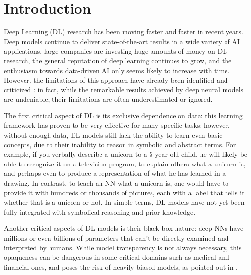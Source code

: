 \chapter{Introduction}
\label{introduction}

Deep Learning (DL) research has been moving faster and faster in recent years. Deep models continue to deliver state-of-the-art results in a wide variety of AI applications, large companies are investing huge amounts of money on DL research, the general reputation of deep learning continues to grow, and the enthusiasm towards data-driven AI only seems likely to increase with time. However, the limitations of this approach have already been identified and criticized \cite{marcus2018appraisal}: in fact, while the remarkable results achieved by deep neural models are undeniable, their limitations are often underestimated or ignored.

The first critical aspect of DL is its exclusive dependence on data: this learning framework has proven to be very effective for many specific tasks; however, without enough data, DL models still lack the ability to learn even basic concepts, due to their inability to reason in symbolic and abstract terms. For example, if you verbally describe a unicorn to a 5-year-old child, he will likely be able to recognize it on a television program, to explain others what a unicorn is, and perhaps even to produce a representation of what he has learned in a drawing. In contrast, to teach an NN what a unicorn is, one would have to provide it with hundreds or thousands of pictures, each with a label that tells it whether that is a unicorn or not. In simple terms, DL models have not yet been fully integrated with symbolical reasoning and prior knowledge. 

Another critical aspects of DL models is their black-box nature: deep NNs have millions or even billions of parameters that can't be directly examined and interpreted by humans.
While model transparency is not always necessary, this opaqueness can be dangerous in some critical domains such as medical and financial ones, and poses the risk of heavily biased models, as pointed out in \cite{o2016weapons}.


